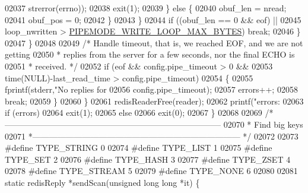 \begin{DoxyCode}
{{{{{{{{{{{{{{{{{{{{{{{{{{{{{{{{{{{{{{{{{{{{{{{{{{{{{{{{{02037                             strerror(errno));
02038                         exit(1);
02039                     \} \textcolor{keywordflow}{else} \{
02040                         obuf\_len = nread;
02041                         obuf\_pos = 0;
02042                     \}
02043                 \}
02044                 \textcolor{keywordflow}{if} ((obuf\_len == 0 && eof) ||
02045                     loop\_nwritten > \hyperlink{redis-cli_8c_aaefb577451e0f5fc0ff993bda43044b6}{PIPEMODE\_WRITE\_LOOP\_MAX\_BYTES}) \textcolor{keywordflow}{break};
02046             \}
02047         \}
02048 
02049         \textcolor{comment}{/* Handle timeout, that is, we reached EOF, and we are not getting}
02050 \textcolor{comment}{         * replies from the server for a few seconds, nor the final ECHO is}
02051 \textcolor{comment}{         * received. */}
02052         \textcolor{keywordflow}{if} (eof && config.pipe\_timeout > 0 &&
02053             time(NULL)-last\_read\_time > config.pipe\_timeout)
02054         \{
02055             fprintf(stderr,\textcolor{stringliteral}{"No replies for %
02056                 config.pipe\_timeout);
02057             errors++;
02058             \textcolor{keywordflow}{break};
02059         \}
02060     \}
02061     redisReaderFree(reader);
02062     printf(\textcolor{stringliteral}{"errors: %
02063     \textcolor{keywordflow}{if} (errors)
02064         exit(1);
02065     \textcolor{keywordflow}{else}
02066         exit(0);
02067 \}
02068 
02069 \textcolor{comment}{/*------------------------------------------------------------------------------}
02070 \textcolor{comment}{ * Find big keys}
02071 \textcolor{comment}{ *--------------------------------------------------------------------------- */}
02072 
02073 \textcolor{preprocessor}{#}\textcolor{preprocessor}{define} \textcolor{preprocessor}{TYPE\_STRING} 0
02074 \textcolor{preprocessor}{#}\textcolor{preprocessor}{define} \textcolor{preprocessor}{TYPE\_LIST}   1
02075 \textcolor{preprocessor}{#}\textcolor{preprocessor}{define} \textcolor{preprocessor}{TYPE\_SET}    2
02076 \textcolor{preprocessor}{#}\textcolor{preprocessor}{define} \textcolor{preprocessor}{TYPE\_HASH}   3
02077 \textcolor{preprocessor}{#}\textcolor{preprocessor}{define} \textcolor{preprocessor}{TYPE\_ZSET}   4
02078 \textcolor{preprocessor}{#}\textcolor{preprocessor}{define} \textcolor{preprocessor}{TYPE\_STREAM} 5
02079 \textcolor{preprocessor}{#}\textcolor{preprocessor}{define} \textcolor{preprocessor}{TYPE\_NONE}   6
02080 
02081 \textcolor{keyword}{static} redisReply *sendScan(\textcolor{keywordtype}{unsigned} \textcolor{keywordtype}{long} \textcolor{keywordtype}{long} *it) \{
}}}}}}}}}}}}}}}}}}}}}}}}}}}}}}}}}}}}}}}}}}}}}}}}}}}}}}}}}}}
\end{DoxyCode}
